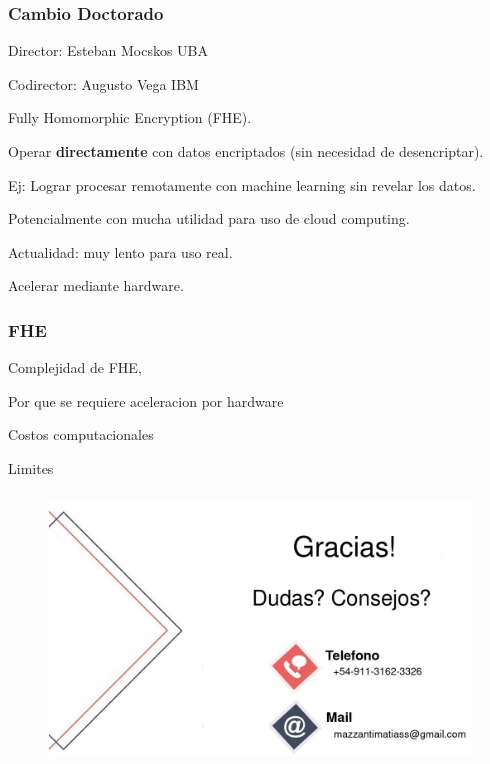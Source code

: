 \documentclass[10pt]{beamer}
\begin{document}
\begin{frame}
\frametitle{Cambio Doctorado}


Director: Esteban Mocskos UBA

Codirector: Augusto Vega IBM

Fully Homomorphic Encryption (FHE).

Operar \textbf{directamente} con datos encriptados (sin necesidad de desencriptar).

Ej: Lograr procesar remotamente con machine learning sin revelar los datos.

Potencialmente con mucha utilidad para uso de cloud computing.

Actualidad: muy lento para uso real.

\begin{mdframed}[backgroundcolor=frenchblue!20]\centering
  Acelerar mediante hardware.
\end{mdframed}

\end{frame}
\begin{frame}
\frametitle{FHE}
Complejidad de FHE,

Por que se requiere aceleracion por hardware

Costos computacionales

Limites

\end{frame}


\begin{frame}
\frametitle{}
  \begin{figure}[h!]
      \centering
      \includegraphics[scale=0.3]{agradecimientos.jpg}
  \end{figure}
\end{frame}
\end{document}

